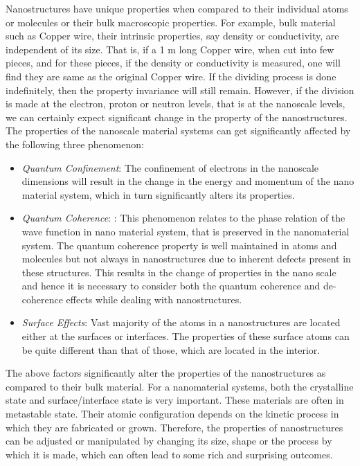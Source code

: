 Nanostructures have unique properties when compared to their individual atoms or
molecules or their bulk macroscopic properties. For example, bulk material such as
Copper wire, their intrinsic properties, say density or conductivity, are independent
of its size. That is, if a 1 m long Copper wire, when cut into few pieces, and for these pieces, if the density or conductivity is measured, one will find they are same as the original Copper wire. If the dividing process is done indefinitely, then the property invariance will still remain. However, if the division is made at the electron, proton or neutron levels, that is at the nanoscale levels, we can certainly expect significant change in the property of the nanostructures. The properties of the nanoscale material systems can get significantly affected by the following three phenomenon:
\begin{itemize}
\item \textit{Quantum Confinement}: The confinement of electrons in the nanoscale dimensions will result in the change in the energy and momentum of the nano material system, which in turn significantly alters its properties.
\item \textit{Quantum Coherence}: : This phenomenon relates to the phase relation of the wave function in nano material system, that is preserved in the nanomaterial system. The quantum coherence property is well maintained in atoms and molecules but not always in nanostructures due to inherent defects present in these structures.
This results in the change of properties in the nano scale and hence it is necessary
to consider both the quantum coherence and de-coherence effects while dealing
with nanostructures.
\item \textit{Surface Effects}: Vast majority of the atoms in a nanostructures are located either at the surfaces or interfaces. The properties of these surface atoms can be quite different than that of those, which are located in the interior.
\end{itemize}

The above factors significantly alter the properties of the nanostructures as compared to their bulk material. For a nanomaterial systems, both the crystalline state and surface/interface state is very important. These materials are often in metastable state. Their atomic configuration depends on the kinetic process in which they are fabricated or grown. Therefore, the properties of nanostructures can be adjusted or manipulated by changing its size, shape or the process by which it is made, which can often lead to some rich and surprising outcomes.

